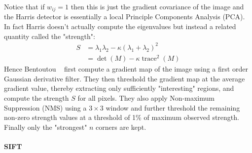 Notice that if $w_{ij} = 1$ then this is just the gradient covariance of the image and the Harris detector is essentially a local Principle Components Analysis (PCA).
%
In fact Harris doesn't actually compute the eigenvalues but instead a related quantity called the "strength":
\begin{align}
    S &= \lambda_1 \lambda_2 - \kappa (\lambda_1 + \lambda_2)^2 \\
    &= \operatorname{det}(M) - \kappa \operatorname{trace}^2(M)
    \label{eqn:strength}
\end{align}
%
Hence Bentoutou \etal~ first compute a gradient map of the image using a first order Gaussian derivative filter.
%
They then threshold the gradient map at the average gradient value, thereby extracting only sufficiently "interesting" regions, and compute the strength $S$ for all pixels.
%
They also apply Non-maximum Suppression (NMS) using a $3 \times 3$ window and further threshold the remaining non-zero strength values at a threshold of 1\% of maximum observed strength.
%
Finally only the "strongest" $n$ corners are kept.

\paragraph{SIFT}

